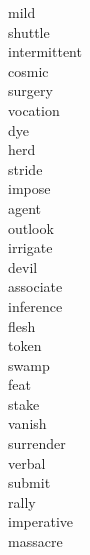 \documentclass[a4paper, 11pt]{ctexart}
\begin{document}
\begin{multicols*}{3}
\begin{description}
\item[mild]

\item[shuttle]

\item[intermittent]

\item[cosmic]

\item[surgery]

\item[vocation]

\item[dye]

\item[herd]

\item[stride]

\item[impose]

\item[agent]

\item[outlook]

\item[irrigate]

\item[devil]

\item[associate]

\item[inference]

\item[flesh]

\item[token]

\item[swamp]

\item[feat]

\item[stake]

\item[vanish]

\item[surrender]

\item[verbal]

\item[submit]

\item[rally]

\item[imperative]

\item[massacre]


\end{description}
\end{multicols*}
\end{document}
